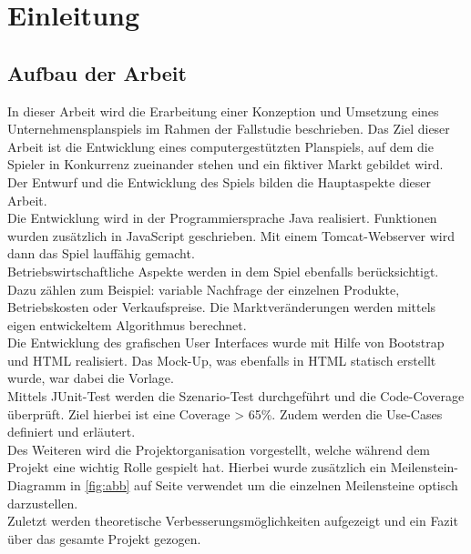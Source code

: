 \clearpage
\chapter{Einleitung}
\section{Aufbau der Arbeit}
In dieser Arbeit wird die Erarbeitung einer Konzeption und Umsetzung eines Unternehmensplanspiels im Rahmen der Fallstudie beschrieben. Das Ziel dieser Arbeit ist die Entwicklung eines computergestützten Planspiels, auf dem die Spieler in Konkurrenz zueinander stehen und ein fiktiver Markt gebildet wird. Der Entwurf und die Entwicklung des Spiels bilden die Hauptaspekte dieser Arbeit. \\
Die Entwicklung wird in der Programmiersprache Java realisiert. Funktionen wurden zusätzlich in JavaScript geschrieben. Mit einem Tomcat-Webserver wird dann das Spiel lauffähig gemacht. \\
Betriebswirtschaftliche Aspekte werden in dem Spiel ebenfalls berücksichtigt. Dazu zählen zum Beispiel: variable Nachfrage der einzelnen Produkte, Betriebskosten oder Verkaufspreise. Die Marktveränderungen werden mittels eigen entwickeltem Algorithmus berechnet. \\
Die Entwicklung des grafischen User Interfaces wurde mit Hilfe von Bootstrap und HTML realisiert. Das Mock-Up, was ebenfalls in HTML statisch erstellt wurde, war dabei die Vorlage. \\ 
Mittels JUnit-Test werden die Szenario-Test durchgeführt und die Code-Coverage überprüft. Ziel hierbei ist eine Coverage > 65\%. Zudem werden die Use-Cases definiert und erläutert. \\
Des Weiteren wird die Projektorganisation vorgestellt, welche während dem Projekt eine wichtig Rolle gespielt hat. Hierbei wurde zusätzlich ein Meilenstein-Diagramm in \ref{fig:abb} auf Seite \pageref{sec:meilenstein} verwendet um die einzelnen Meilensteine optisch darzustellen.\\
Zuletzt werden theoretische Verbesserungsmöglichkeiten aufgezeigt und ein Fazit über das gesamte Projekt gezogen.

\clearpage
